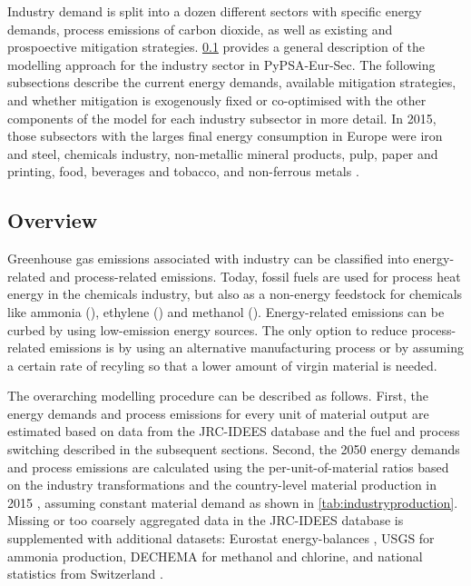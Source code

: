 Industry demand is split into a dozen different sectors with specific energy
demands, process emissions of carbon dioxide, as well as existing and
prospoective mitigation strategies. \cref{sec:si:industry:overview} provides a
general description of the modelling approach for the industry sector in
PyPSA-Eur-Sec. The following subsections describe the current energy demands,
available mitigation strategies, and whether mitigation is exogenously fixed or
co-optimised with the other components of the model for each industry subsector
in more detail. In 2015, those subsectors with the larges final energy
consumption in Europe were iron and steel, chemicals industry, non-metallic
mineral products, pulp, paper and printing, food, beverages and tobacco, and
non-ferrous metals \cite{IDEES}.

\subsection{Overview}
\label{sec:si:industry:overview}

Greenhouse gas emissions associated with industry can be classified into
energy-related and process-related emissions. Today, fossil fuels are used for
process heat energy in the chemicals industry, but also as a non-energy
feedstock for chemicals like ammonia (), ethylene () and
methanol (). Energy-related emissions can be curbed by using
low-emission energy sources. The only option to reduce process-related emissions
is by using an alternative manufacturing process or by assuming a certain rate
of recyling so that a lower amount of virgin material is needed.

The overarching modelling procedure can be described as follows. First, the
energy demands and process emissions for every unit of material output are
estimated based on data from the JRC-IDEES database  and the fuel
and process switching described in the subsequent sections. Second, the 2050
energy demands and process emissions are calculated using the
per-unit-of-material ratios based on the industry transformations and the
country-level material production in 2015 , assuming constant
material demand as shown in \cref{tab:industryproduction}. Missing or too
coarsely aggregated data in the JRC-IDEES database  is supplemented
with additional datasets: Eurostat energy-balances \citeS{}, USGS 
for ammonia production, DECHEMA  for methanol
and chlorine, and national statistics from Switzerland \citeS{}.

